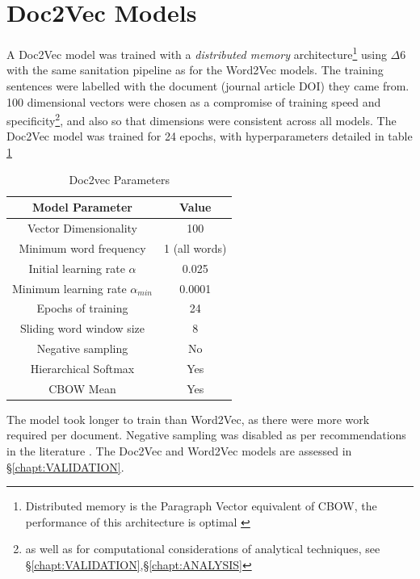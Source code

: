 \section{Doc2Vec Models}
A Doc2Vec model was trained with a \emph{distributed memory} architecture\footnote{Distributed memory is the Paragraph Vector equivalent of CBOW, the performance of this architecture is optimal \cite{doc2vec}} \cite{gensim} using $\Delta6$ with the same sanitation pipeline as for the Word2Vec models. The training sentences were labelled with the document (journal article DOI) they came from. 100 dimensional vectors were chosen as a compromise of training speed and specificity\footnote{as well as for computational considerations of analytical techniques, see \S\ref{chapt:VALIDATION},\S\ref{chapt:ANALYSIS}}, and also so that dimensions were consistent across all models. The Doc2Vec model was trained for 24 epochs, with hyperparameters detailed in table \ref{tab:doc2vechyperparams}
\begin{table}[H]
\begin{center}
\caption{Doc2vec Parameters}
\label{tab:doc2vechyperparams}
\begin{tabular}{||c|c||}
\hline
Model Parameter & Value\\
\hline
Vector Dimensionality & 100\\
Minimum word frequency & 1 (all words)\\
Initial learning rate $\alpha$ & 0.025 \\
Minimum learning rate $\alpha_{min}$&0.0001\\
Epochs of training & 24\\
Sliding word window size & 8\\
Negative sampling & No \\
Hierarchical Softmax & Yes\\
CBOW Mean & Yes \\
\hline
\end{tabular}
\end{center}
\end{table}

The model took longer to train than Word2Vec, as there were more work required per document. Negative sampling was disabled as per recommendations in the literature \cite{gensim}\cite{doc2vec}.
The Doc2Vec and Word2Vec models are assessed in \S\ref{chapt:VALIDATION}.